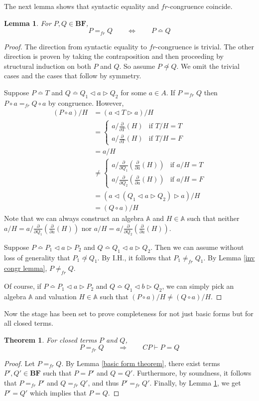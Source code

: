 \documentclass[a4paper,twoside,openright]{report}
\newcommand{\dd}[1]{\frac{\partial}{\partial #1}}
\newcommand{\BF}{\ensuremath{\textbf{BF}}}
\newcommand{\syn}{\bumpeq}
\newcommand{\nsyn}{\not\bumpeq}
\newcommand{\lef}{\ensuremath{\triangleleft}}
\newcommand{\rig}{\ensuremath{\triangleright}}
\newtheorem{lem}[theorem]{Lemma}
\newtheorem{thm}[theorem]{Theorem}
\begin{document}
The next lemma shows that syntactic equality and $fr$-congruence coincide.
\begin{lem}\label{completeness lemma}
For $P,Q\in\BF$,
\[
P=_{fr}Q\qquad\Longleftrightarrow\qquad P\syn Q
\]
\end{lem}
\begin{proof}
The direction from syntactic equality to $fr$-congruence is trivial. The other direction is proven by taking the contraposition and then proceeding by structural induction on both $P$ and $Q$. So assume $P\nsyn Q$. We omit the trivial cases and the cases that follow by symmetry. 

Suppose $P\syn T$ and $Q\syn Q_1\lef a\rig Q_2$ for some $a\in A$. If $P=_{fr}Q$ then $P\circ a=_{fr}Q\circ a$ by congruence. However,
\begin{align*}
(P\circ a)/H &= (a\lef T\rig a)/H\\
&=\begin{cases}
a/\dd T(H) & \text{if $T/H=T$}\\
a/\dd T(H) & \text{if $T/H=F$}
\end{cases}\\
&= a/H\\
&\ne\begin{cases}
a/\dd{Q_1}(\dd a(H)) & \text{if $a/H=T$}\\
a/\dd{Q_2}(\dd a(H)) & \text{if $a/H=F$}
\end{cases}\\
&= (a\lef (Q_1\lef a\rig Q_2)\rig a)/H\\
&= (Q\circ a)/H
\end{align*}
Note that we can always construct an algebra $\mathbb{A}$ and $H\in\mathbb{A}$ such that neither $a/H=a/\dd{Q_1}(\dd a(H))$ nor $a/H=a/\dd{Q_2}(\dd a(H))$.

Suppose $P\syn P_1\lef a\rig P_2$ and $Q\syn Q_1\lef a\rig Q_2$. Then we can assume without loss of generality that $P_1\nsyn Q_1$. By I.H., it follows that $P_1\ne_{fr}Q_1$. By Lemma \ref{inv congr lemma}, $P\ne_{fr}Q$.

Of course, if $P\syn P_1\lef a\rig P_2$ and $Q\syn Q_1\lef b\rig Q_2$, we can simply pick an algebra $\mathbb{A}$ and valuation $H\in\mathbb{A}$ such that $(P\circ a)/H\ne (Q\circ a)/H$.
\end{proof}

Now the stage has been set to prove completeness for not just basic forms but for all closed terms.

\begin{thm}\label{completeness thm}
For closed terms $P$ and $Q$,
\[
P=_{fr}Q\qquad\Longrightarrow\qquad CP\vdash P=Q
\]
\end{thm}
\begin{proof}
Let $P=_{fr}Q$. By Lemma \ref{basic form theorem}, there exist
terms $P',Q'\in\BF$ such that $P=P'$ and $Q=Q'$.
Furthermore, by soundness, it follows that $P=_{fr}P'$ and $Q=_{fr}Q'$, and
thus $P'=_{fr}Q'$. Finally, by Lemma \ref{completeness lemma}, we get
$P'=Q'$ which implies that $P=Q$.
\end{proof}
\end{document}
